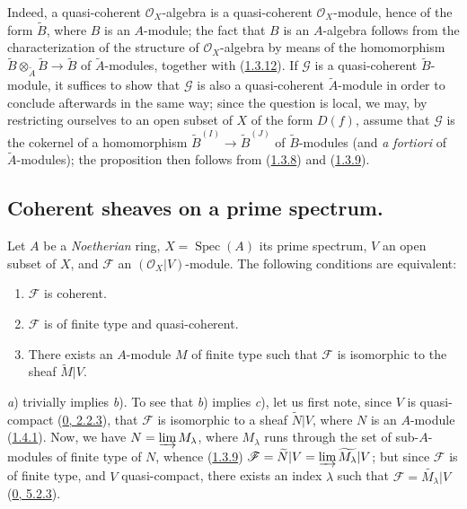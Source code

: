 Indeed, a quasi-coherent $\mathscr{O}_X$-algebra is a quasi-coherent
$\mathscr{O}_X$-module, hence of the form $\widetilde{B}$, where
$B$ is an $A$-module; the fact that $B$ is an $A$-algebra follows from the
characterization of the structure of $\mathscr{O}_X$-algebra by means of
the homomorphism
$\widetilde{B}\otimes_{\widetilde{A}}\widetilde{B}\to\widetilde{B}$ of
$\widetilde{A}$-modules, together with
(\hyperref[I.1.3.12]{1.3.12}). If $\mathscr{G}$ is a quasi-coherent
$\widetilde{B}$-module, it suffices to show that $\mathscr{G}$ is also a
quasi-coherent $\widetilde{A}$-module in order to conclude afterwards in the
same way; since the question is local, we may, by restricting ourselves to
an open subset of $X$ of the form $D(f)$, assume that $\mathscr{G}$ is the
cokernel of a homomorphism
$\widetilde{B}^{(I)}\to\widetilde{B}^{(J)}$ of $\widetilde{B}$-modules (and
\emph{a fortiori} of $\widetilde{A}$-modules); the proposition then follows
from (\hyperref[I.1.3.8]{1.3.8}) and
(\hyperref[I.1.3.9]{1.3.9}).

\subsection{Coherent sheaves on a prime spectrum.}
\label{subsection:I.1.5}

\begin{theorem}[1.5.1]
\label{I.1.5.1}
Let $A$ be a \emph{Noetherian} ring, $X=\operatorname{Spec}(A)$ its prime
spectrum, $V$ an open subset of $X$, and $\mathscr{F}$ an
$(\mathscr{O}_X|V)$-module. The following conditions are equivalent:
\begin{enumerate}
  \item[\textit{a})] $\mathscr{F}$ is coherent.
  \item[\textit{b})] $\mathscr{F}$ is of finite type and quasi-coherent.
  \item[\textit{c})] There exists an $A$-module $M$ of finite type such that
  $\mathscr{F}$ is isomorphic to the sheaf $\widetilde{M}|V$.
\end{enumerate}
\end{theorem}

\textit{a}) trivially implies \textit{b}). To see that \textit{b})
implies \textit{c}), let us first note, since $V$ is quasi-compact
(\hyperref[0.2.2.3]{0, 2.2.3}), that $\mathscr{F}$ is isomorphic to a
sheaf $\widetilde{N}|V$, where $N$ is an $A$-module
(\hyperref[I.1.4.1]{1.4.1}). Now, we have
$N=\varinjlim M_\lambda$, where $M_\lambda$ runs through the set of
sub-$A$-modules of finite type of $N$, whence
(\hyperref[I.1.3.9]{1.3.9})
$\mathscr{F}=\widetilde{N}|V=\varinjlim\widetilde{M_\lambda}|V$; but since
$\mathscr{F}$ is of finite type, and $V$ quasi-compact, there exists an index
$\lambda$ such that $\mathscr{F}=\widetilde{M_\lambda}|V$
(\hyperref[0.5.2.3]{0, 5.2.3}).

